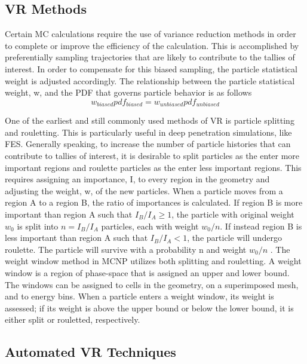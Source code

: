\subsection{VR Methods}

Certain MC calculations require the use of variance reduction methods in order
to complete or improve the efficiency of the calculation. 
This is accomplished
by preferentially sampling trajectories that are likely to contribute to the tallies of
interest.
In order to compensate for this biased sampling, the particle statistical weight
is adjusted accordingly.
The relationship between the particle statistical weight, w, and the PDF that
governs particle behavior is as follows
\begin{equation} \label{eq:2.1}
		w_{biased} pdf_{biased} = w_{unbiased} pdf_{unbiased}
\end{equation}

One of the earliest and still commonly used methods of VR is particle splitting
and rouletting.  This is particularly useful in deep penetration simulations,
like FES.  Generally speaking, to increase the number of particle
histories that can contribute to tallies of interest, it is desirable to split
particles as the enter more important regions and roulette particles as the
enter less important regions. 
This requires assigning an importance, I, to every
region in the geometry and adjusting the weight, w, of the new particles. 
When a particle moves from a region A to a region B,
the ratio of importances is calculated.  If region B is more important than
region A such that 
$I_{B}/I_{A} \geqslant 1$, 
the particle with original weight $w_{0}$ is split into 
$n = I_{B}/I_{A}$
particles, each with weight $w_{0}/n$.  If instead region B is less important
than
region A such that
$I_{B}/I_{A} < 1$, 
the particle will undergo roulette. 
The particle will survive with a probability n and weight $w_{0}/n$
\cite{Carter_Cashwell_1975}.
The weight window method in MCNP utilizes both splitting and
rouletting.  A weight window is a region of phase-space that is assigned an upper and
lower bound.  The windows can be assigned to cells in the geometry, on a
superimposed mesh, and to energy bins.  When a particle enters a weight window, its weight is assessed; if
its weight is above the upper bound or below the lower bound, it is either split
or rouletted, respectively.


\subsection{Automated VR Techniques}

